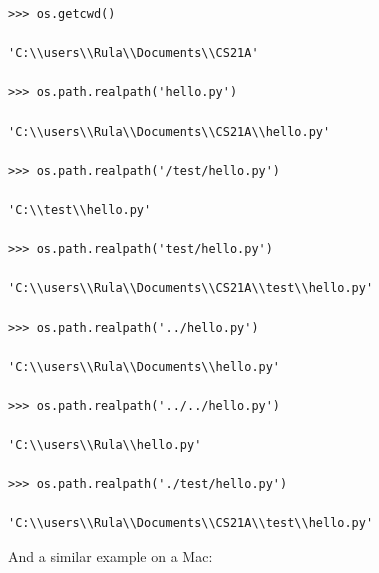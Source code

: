 \documentclass{article}
\begin{document}
\begin{lstlisting}
>>> os.getcwd()

'C:\\users\\Rula\\Documents\\CS21A'

>>> os.path.realpath('hello.py')

'C:\\users\\Rula\\Documents\\CS21A\\hello.py' 

>>> os.path.realpath('/test/hello.py')

'C:\\test\\hello.py' 

>>> os.path.realpath('test/hello.py')

'C:\\users\\Rula\\Documents\\CS21A\\test\\hello.py'

>>> os.path.realpath('../hello.py')

'C:\\users\\Rula\\Documents\\hello.py'

>>> os.path.realpath('../../hello.py')

'C:\\users\\Rula\\hello.py'

>>> os.path.realpath('./test/hello.py')

'C:\\users\\Rula\\Documents\\CS21A\\test\\hello.py'
\end{lstlisting}

And a similar example on a Mac:
\end{document}
